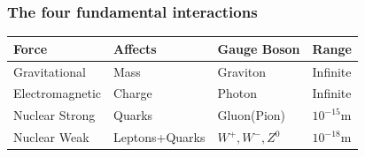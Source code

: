 \documentclass[12pt]{article}
\begin{document}
\subsubsection{The four fundamental interactions}
{\def\arraystretch{1.5}
\begin{tabularx}{\textwidth}{|X|X|X|X|}
\hline
\textbf{Force}&\textbf{Affects}&\textbf{Gauge Boson}&\textbf{Range}\\
\hline
Gravitational&Mass&Graviton&Infinite\\
\hline
Electromagnetic&Charge&Photon&Infinite\\
\hline
Nuclear Strong&Quarks&Gluon(Pion)&$10^{-15}$m\\
\hline
Nuclear Weak&Leptons+Quarks&$W^+,W^-,Z^0$&$10^{-18}$m\\
\hline
\end{tabularx}}
\newpage
\end{document}
